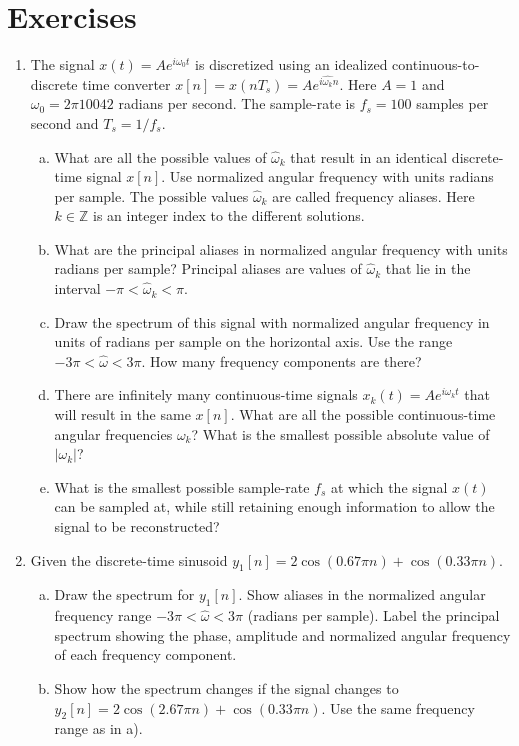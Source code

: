 \newpage
\section{Exercises}%

\begin{enumerate}
\item The signal $x(t) = A e^{i\omega_0 t}$ is discretized using an
  idealized continuous-to-discrete time converter $x[n]=x(n T_s)=Ae^{i\hat{\omega_k} n}$. Here $A=1$ and
  $\omega_0=2\pi 10042$ radians per second. The sample-rate is $f_s=100$ samples per
  second and $T_s=1/f_s$.
  \begin{enumerate}[a)]
  \item What are all the possible values of $\hat{\omega}_k$ that result in an identical discrete-time signal $x[n]$. Use normalized angular frequency with units radians per sample. The possible values $\hat{\omega}_k$ are called frequency aliases. Here $k\in \mathbb{Z}$ is an integer index to the different solutions.
  \item What are the principal aliases in normalized angular frequency
    with units radians per sample? Principal aliases are values of $\hat{\omega}_k$ that lie in the interval $-\pi < \hat{\omega}_k < \pi$.
  \item Draw the spectrum of this signal with normalized angular frequency in units of radians per sample on the horizontal axis. Use the range $-3\pi < \hat{\omega} < 3\pi$. How many frequency components are there?
  \item There are infinitely many continuous-time signals $x_k(t)=A e^{i\omega_k t}$ that will result in the same $x[n]$. What are all the possible continuous-time angular frequencies $\omega_k$? What is the smallest possible absolute value of $|\omega_k|$?
    \item What is the smallest possible sample-rate $f_s$ at which the signal $x(t)$ can be sampled at, while still retaining enough information to allow the signal to be reconstructed?
  \end{enumerate}

\item Given the discrete-time sinusoid $y_1[n] = 2 \cos(0.67 \pi n) + \cos(0.33 \pi n)$.
  \begin{enumerate}[a)]
    \item Draw the spectrum for $y_1[n]$. Show aliases in the normalized angular frequency range $-3\pi < \hat{\omega} < 3\pi$ (radians per sample). Label the principal spectrum showing the phase, amplitude and normalized angular frequency of each frequency component.
    \item Show how the spectrum changes if the signal changes to $y_2[n] = 2 \cos(2.67 \pi n) + \cos(0.33 \pi n)$. Use the same frequency range as in a).
  \end{enumerate}
  

\end{enumerate}
